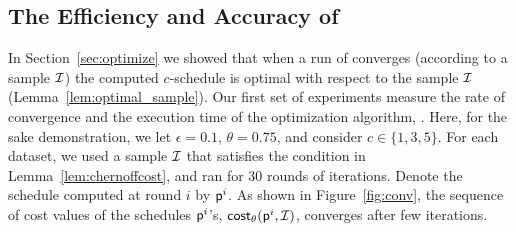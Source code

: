  
\begin{table}[ht]
\centering
{}
\caption{The datasets and corresponding statistics.}\label{table:datasets}
\end{table}







\subsection{The Efficiency and Accuracy of \algonameapx}
In Section~\ref{sec:optimize}  we showed that when a run of \algonameapx converges
(according to a sample $\mathcal{I}$) the computed $c$-schedule is optimal with
respect to the sample $\mathcal{I}$ (Lemma~\ref{lem:optimal_sample}). Our first set
of experiments measure the rate of convergence and the execution time of the
optimization algorithm, \algonameapx. Here, for the sake demonstration, we let $\epsilon=0.1$, $\theta=0.75$, and consider $c\in\{1,3,5\}$. For each dataset, we used a sample $\mathcal{I}$ that satisfies the condition in Lemma~\ref{lem:chernoffcost}, and ran \algonameapx for 30 rounds of iterations. Denote the schedule computed at round $i$ by $\mathsf{p}^i$.
As shown in Figure~\ref{fig:conv}, the sequence of cost values of the schedules $\mathsf{p}^i$'s, $\mathsf{cost}_\theta(\mathsf{p}^i,\mathcal{I})$, converges after few iterations.


